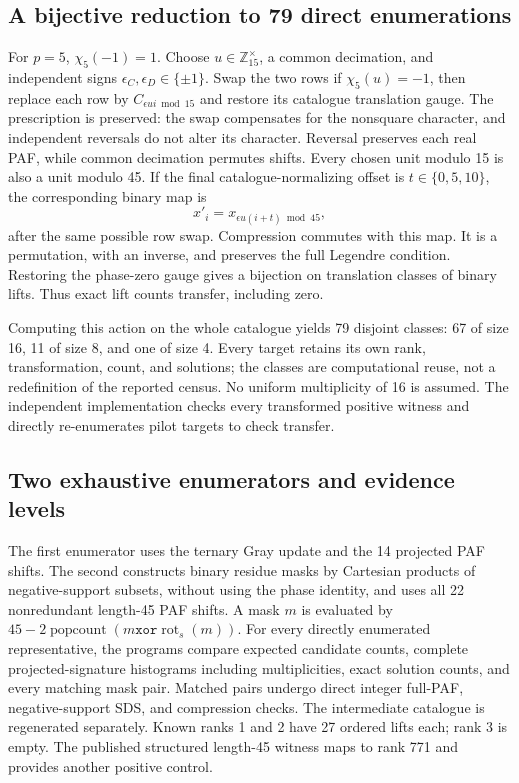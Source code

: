 \documentclass[11pt]{article}
\newcommand{\Z}{\mathbb Z}
\begin{document}
\subsection{A bijective reduction to 79 direct enumerations}
For $p=5$, $\chi_5(-1)=1$. Choose $u\in\Z_{15}^{\times}$, a common
decimation, and independent signs $\epsilon_C,\epsilon_D\in\{\pm1\}$.
Swap the two rows if $\chi_5(u)=-1$, then replace each row by
$C_{\epsilon u i\bmod15}$ and restore its catalogue translation gauge.
The prescription is preserved: the swap compensates for the nonsquare
character, and independent reversals do not alter its character.
Reversal preserves each real PAF, while common decimation permutes shifts.
Every chosen unit modulo 15 is also a unit modulo 45. If the final
catalogue-normalizing offset is $t\in\{0,5,10\}$, the corresponding binary
map is
\begin{equation}\label{eq:transfer}
 x'_i=x_{\epsilon u(i+t)\bmod45},
\end{equation}
after the same possible row swap. Compression commutes with this map.
It is a permutation, with an inverse, and preserves the full Legendre
condition. Restoring the phase-zero gauge gives a bijection on translation
classes of binary lifts. Thus exact lift counts transfer, including zero.

Computing this action on the whole catalogue yields 79 disjoint classes:
67 of size 16, 11 of size 8, and one of size 4. Every target retains its own
rank, transformation, count, and solutions; the classes are computational
reuse, not a redefinition of the reported census. No uniform multiplicity
of 16 is assumed. The independent implementation checks every transformed
positive witness and directly re-enumerates pilot targets to check transfer.

\subsection{Two exhaustive enumerators and evidence levels}
The first enumerator uses the ternary Gray update and the 14 projected
PAF shifts. The second constructs binary residue masks by Cartesian products
of negative-support subsets, without using the phase identity, and uses
all 22 nonredundant length-45 PAF shifts. A mask $m$ is evaluated by
$45-2\operatorname{popcount}(m\mathbin{\mathtt{xor}}\operatorname{rot}_s(m))$.
For every directly enumerated representative, the programs compare expected
candidate counts, complete projected-signature histograms including
multiplicities, exact solution counts, and every matching mask pair.
Matched pairs undergo direct integer full-PAF, negative-support SDS, and
compression checks. The intermediate catalogue is regenerated separately.
Known ranks 1 and 2 have 27 ordered lifts each; rank 3 is empty. The
published structured length-45 witness maps to rank 771 and provides another
positive control.
\end{document}
